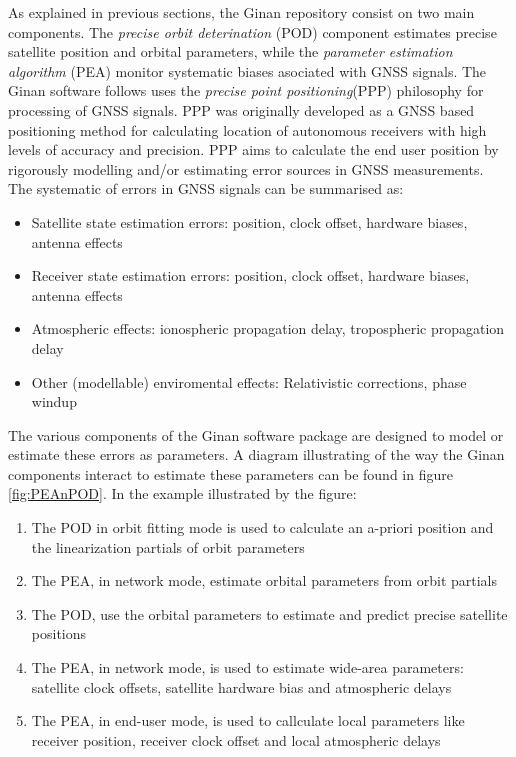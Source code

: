 As explained in previous sections, the Ginan repository consist on two main components. The \textit{precise orbit deterination} (POD) component estimates precise satellite position and orbital parameters, while the \textit{parameter estimation algorithm} (PEA) monitor systematic biases asociated with GNSS signals. The Ginan software follows uses the \textit{precise point positioning}(PPP) philosophy for processing of GNSS signals. PPP was originally developed as a GNSS based positioning method for calculating location of autonomous receivers with high levels of accuracy and precision. PPP aims to calculate the end user position by rigorously modelling and/or estimating error sources in GNSS measurements. 
The systematic of errors in GNSS signals can be summarised as: 
\begin{itemize}
	\item Satellite state estimation errors: position, clock offset, hardware biases, antenna effects
	\item Receiver state estimation errors: position, clock offset, hardware biases, antenna effects
	\item Atmospheric effects: ionospheric propagation delay, tropospheric propagation delay
	\item Other (modellable) enviromental effects: Relativistic corrections, phase windup
\end{itemize}

The various components of the Ginan software package are designed to model or estimate these errors as parameters. A diagram illustrating of the way the Ginan components interact to estimate these parameters can be found in figure \ref{fig:PEAnPOD}. In the example illustrated by the figure:
\begin{enumerate}
	\item  The POD in orbit fitting mode is used to calculate an a-priori position and the linearization partials of orbit parameters  
	\item  The PEA, in network mode, estimate orbital parameters from orbit partials
	\item  The POD, use the orbital parameters to estimate and predict precise satellite positions
	\item  The PEA, in network mode, is used to estimate wide-area parameters: satellite clock offsets, satellite hardware bias and atmospheric delays 
	\item  The PEA, in end-user mode, is used to callculate local parameters like receiver position, receiver clock offset and local atmospheric delays 
\end{enumerate}

